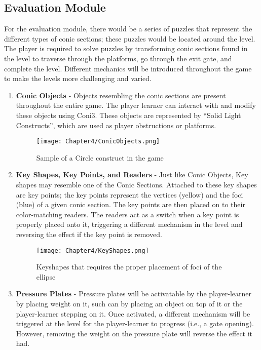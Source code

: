 \subsection{Evaluation Module}
\label{sec:evaluationmodule}
For the evaluation module, there would be a series of puzzles that represent the different types of conic sections; these puzzles would be located around the level. The player is required to solve puzzles by transforming conic sections found in the level to traverse through the platforms, go through the exit gate, and complete the level. Different mechanics will be introduced throughout the game to make the levels more challenging and varied.

\begin{enumerate}
    \item \textbf{Conic Objects} - Objects resembling the conic sections are present throughout the entire game. The player learner can interact with and modify these objects using Coni3. These objects are represented by “Solid Light Constructs”, which are used as player obstructions or platforms.
\begin{figure}[H]
\hspace*{-1cm}
   \centering                  
   \texttt{[image: Chapter4/ConicObjects.png]}      
   \caption{Sample of a Circle construct in the game}
    \label{fig:circleconstruct}
\end{figure}    
    \item \textbf{Key Shapes, Key Points, and Readers} - Just like Conic Objects, Key shapes may resemble one of the Conic Sections. Attached to these key shapes are key points; the key points represent the vertices (yellow) and the foci (blue) of a given conic section. The key points are then placed on to their color-matching readers. The readers act as a switch when a key point is properly placed onto it, triggering a different mechanism in the level and reversing the effect if the key point is removed.
\begin{figure}[H]
\hspace*{-1cm}
   \centering                  
   \texttt{[image: Chapter4/KeyShapes.png]}      
   \caption{Keyshapes that requires the proper placement of foci of the ellipse }
    \label{fig:keyshapes}
\end{figure}
    \item \textbf{Pressure Plates} - Pressure plates will be activatable by the player-learner by placing weight on it, such can by placing an object on top of it or the player-learner stepping on it. Once activated, a different mechanism will be triggered at the level for the player-learner to progress (i.e., a gate opening). However, removing the weight on the pressure plate will reverse the effect it had.

\end{enumerate}
